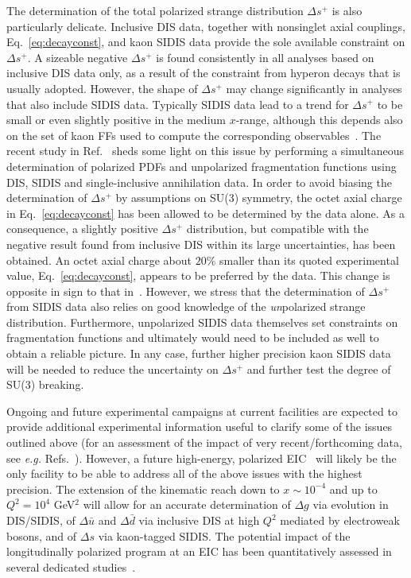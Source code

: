 The determination of the total polarized strange distribution $\Delta s^+$ is 
also particularly delicate.
%
Inclusive DIS data, together with nonsinglet axial couplings, 
Eq.~\eqref{eq:decayconst}, and kaon SIDIS data provide the sole available 
constraint on $\Delta s^+$.
%
A sizeable negative $\Delta s^+$ is found 
consistently in all analyses based on inclusive DIS data only, as a result 
of the constraint from hyperon decays that is usually adopted. 
%
However, the shape of $\Delta s^+$ may change significantly in analyses that also include
SIDIS data. Typically SIDIS data lead to a trend for $\Delta s^+$ to be
small or even slightly positive in the medium $x$-range, although this depends 
also on the set of kaon FFs used to compute
the corresponding observables~\cite{Leader:2011tm}.  
%
The recent study in Ref.~\cite{Ethier:2017zbq} sheds some light on this issue
by performing a simultaneous determination of polarized PDFs and unpolarized 
fragmentation functions using DIS, SIDIS and single-inclusive annihilation data.
%
In order to avoid biasing the determination of $\Delta s^+$ by 
assumptions on SU(3) symmetry, the octet axial charge in 
Eq.~\eqref{eq:decayconst} has been allowed to be determined by the data alone.
%
As a consequence, a slightly positive $\Delta s^+$ distribution, but
compatible with the negative result found from inclusive DIS within its 
large uncertainties, has been obtained.
% 
An octet axial charge about $20\%$ smaller than its quoted experimental value, 
Eq.~\eqref{eq:decayconst}, appears to be preferred by the data.
%
This change is opposite in sign to that in~\cite{FloresMendieta:1998ii}.
%
However, we stress that the determination of $\Delta s^+$ from SIDIS data 
also relies on good knowledge of the {\it un}polarized strange distribution. 
%
Furthermore, unpolarized SIDIS data themselves set constraints on 
fragmentation functions and ultimately would need to be included as well
to obtain a reliable picture. 
%
In any case, further higher precision kaon SIDIS data will be needed 
to reduce the uncertainty on $\Delta s^+$ and further test the degree of 
SU(3) breaking. 

Ongoing and future experimental campaigns at current facilities are
expected to provide additional experimental information
useful to clarify some of the issues outlined above (for an 
assessment of the impact of very recent/forthcoming data, see {\it e.g.}
Refs.~\cite{Aschenauer:2015eha,Aschenauer:2015ata,Nocera:2015vva,
Nocera:2017wep}).
%
However, a future high-energy, polarized EIC~\cite{Accardi:2012qut} will 
likely be the only facility to be able to address all of the above issues 
with the highest precision. 
% 
The extension of the kinematic reach down to $x\sim 10^{-4}$ and up to
$Q^2=10^4$ GeV$^2$ will allow for an accurate determination of $\Delta g$
via evolution in DIS/SIDIS, of $\Delta\bar{u}$ and 
$\Delta\bar{d}$ via inclusive DIS at high $Q^2$ mediated by electroweak bosons,
and of $\Delta s$ via kaon-tagged SIDIS. 
%
The potential impact of the longitudinally polarized program at an EIC
has been quantitatively assessed in several dedicated 
studies~\cite{Aschenauer:2012ve,Ball:2013tyh,Aschenauer:2013iia,
Aschenauer:2015ata}.

